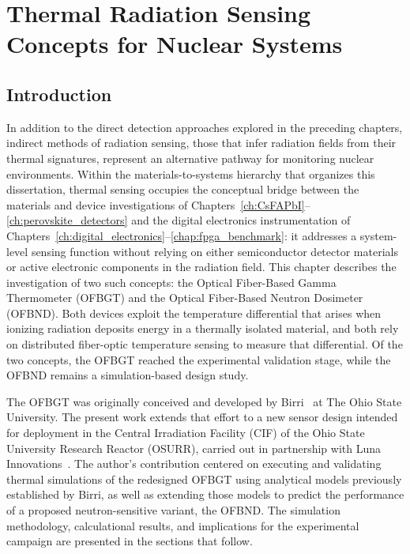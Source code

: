 \chapter{Thermal Radiation Sensing Concepts for Nuclear Systems}
\label{ch:thermal_sensing}

\section{Introduction}

In addition to the direct detection approaches explored in the preceding chapters, indirect methods of radiation sensing, those that infer radiation fields from their thermal signatures, represent an alternative pathway for monitoring nuclear environments.  Within the materials-to-systems hierarchy that organizes this dissertation, thermal sensing occupies the conceptual bridge between the materials and device investigations of Chapters~\ref{ch:CsFAPbI}--\ref{ch:perovskite_detectors} and the digital electronics instrumentation of Chapters~\ref{ch:digital_electronics}--\ref{chap:fpga_benchmark}: it addresses a system-level sensing function without relying on either semiconductor detector materials or active electronic components in the radiation field.  This chapter describes the investigation of two such concepts: the Optical Fiber-Based Gamma Thermometer (OFBGT) and the Optical Fiber-Based Neutron Dosimeter (OFBND).  Both devices exploit the temperature differential that arises when ionizing radiation deposits energy in a thermally isolated material, and both rely on distributed fiber-optic temperature sensing to measure that differential.  Of the two concepts, the OFBGT reached the experimental validation stage, while the OFBND remains a simulation-based design study.

The OFBGT was originally conceived and developed by Birri~\cite{Birri2021Dissertation} at The Ohio State University.  The present work extends that effort to a new sensor design intended for deployment in the Central Irradiation Facility (CIF) of the Ohio State University Research Reactor (OSURR), carried out in partnership with Luna Innovations~\cite{LunaDOE2024}.  The author's contribution centered on executing and validating thermal simulations of the redesigned OFBGT using analytical models previously established by Birri, as well as extending those models to predict the performance of a proposed neutron-sensitive variant, the OFBND.  The simulation methodology, calculational results, and implications for the experimental campaign are presented in the sections that follow.

